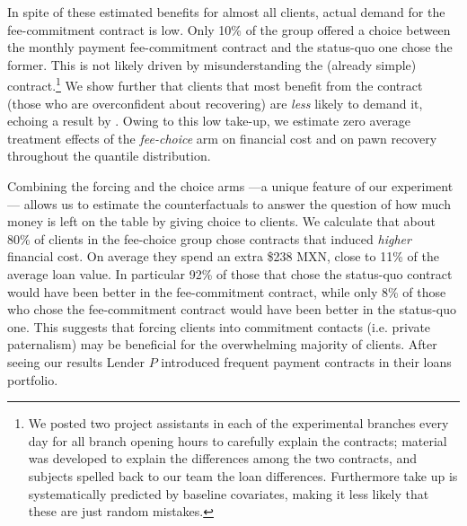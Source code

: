 \documentclass[oneside,11pt]{article}
\begin{document}
In spite of these estimated benefits for almost all clients, actual demand for the fee-commitment contract is low. Only 10\% of the group offered a choice between the monthly payment fee-commitment contract and the status-quo one chose the former. This is not likely driven by misunderstanding the (already simple) contract.\footnote{We posted two project assistants in each of the experimental branches every day for all branch opening hours to carefully explain the contracts; material was developed to explain the differences among the two contracts, and subjects spelled back to our team the loan differences. Furthermore take up is systematically predicted by baseline covariates, making it less likely that these are just random mistakes.} We show further that clients that most benefit from the contract (those who are overconfident about recovering) are \textit{less} likely to demand it, echoing a result by \cite{Sprenger}. %
Owing to this low take-up, we estimate zero average treatment effects of the \textit{fee-choice} arm on financial cost and on pawn recovery throughout the quantile distribution.


Combining the forcing and the choice arms ---a unique feature of our experiment--- allows us to estimate the counterfactuals to answer the question of how much money is left on the table by giving choice to clients. We calculate that about 80\% of clients in the fee-choice group chose contracts that induced \textit{higher} financial cost. On average they spend an extra \$238 MXN, close to 11\% of the average loan value. In particular 92\% of those that chose the status-quo contract would have been better in the fee-commitment contract, while only 8\% of those who chose the fee-commitment contract would have been better in the status-quo one. This suggests that forcing clients into commitment contacts (i.e. private paternalism) may be beneficial for the overwhelming majority of clients. After seeing our results Lender $P$ introduced frequent payment contracts in their loans portfolio.
\end{document}
